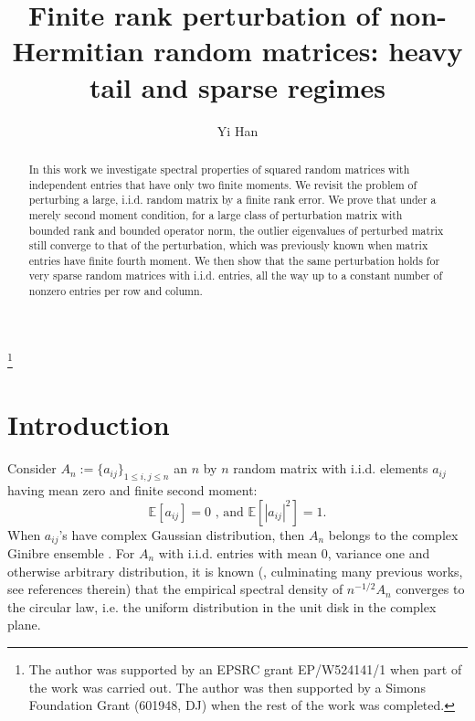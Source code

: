 \documentclass[12pt, reqno]{amsart}
\theoremstyle{definition}
\theoremstyle{remark}
\numberwithin{equation}{section}
\begin{document}
\setcounter{page}{1}

\title[Finite rank perturbations]{Finite rank perturbation of non-Hermitian random matrices: heavy tail and sparse regimes}

\author[Y.H]{Yi Han}
\address{
  Yi Han:
  \endgraf
  Department of Mathematics, Massachusetts Institute of Technology, Cambridge MA
  \endgraf
  {\it E-mail address} {\rm hanyi16@mit.edu}
  }
  





\thanks{The author was supported by an EPSRC grant EP/W524141/1 when part of the work was carried out. The author was then supported by a Simons Foundation Grant (601948, DJ) when the rest of the work was completed.
}

    

\begin{abstract} In this work we investigate spectral properties of squared random matrices with independent entries that have only two finite moments. We revisit the problem of perturbing a large, i.i.d. random matrix by a finite rank error. We prove that under a merely second moment condition, for a large class of perturbation matrix with bounded rank and bounded operator norm, the outlier eigenvalues of perturbed matrix still converge to that of the perturbation, which was previously known when matrix entries have finite fourth moment. We then show that the same perturbation holds for very sparse random matrices with i.i.d. entries, all the way up to a constant number of nonzero entries per row and column.
\end{abstract} 

\maketitle


\allowdisplaybreaks


\section{Introduction}

Consider $A_n:=\{a_{ij}\}_{1\leq i,j\leq n}$ an $n$ by $n$ random matrix with i.i.d. elements $a_{ij}$ having mean zero and finite second moment: \begin{equation}\label{firstcondition}\mathbb{E}[a_{ij}]=0 \text{ , and } \mathbb{E}[|a_{ij}|^2]=1.\end{equation} When $a_{ij}$'s have complex Gaussian distribution, then $A_n$ belongs to the complex Ginibre ensemble \cite{ginibre1965statistical}. For $A_n$ with i.i.d. entries with mean $0$, variance one and otherwise arbitrary distribution, it is known (\cite{ WOS:000281425000010}, culminating many previous works, see references therein) that the empirical spectral density of $n^{-1/2}A_n$ converges to the circular law, i.e. the uniform distribution in the unit disk in the complex plane. 
\end{document}
